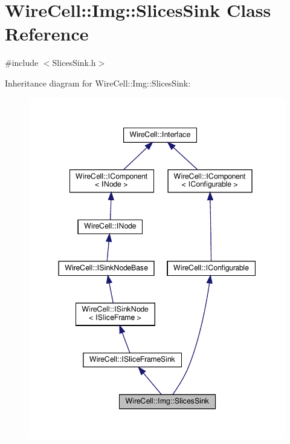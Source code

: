 \hypertarget{class_wire_cell_1_1_img_1_1_slices_sink}{}\section{Wire\+Cell\+:\+:Img\+:\+:Slices\+Sink Class Reference}
\label{class_wire_cell_1_1_img_1_1_slices_sink}


{\ttfamily \#include $<$Slices\+Sink.\+h$>$}



Inheritance diagram for Wire\+Cell\+:\+:Img\+:\+:Slices\+Sink\+:
\nopagebreak
\begin{figure}[H]
\begin{center}
\leavevmode
\includegraphics[width=344pt]{class_wire_cell_1_1_img_1_1_slices_sink__inherit__graph}
\end{center}
\end{figure}


